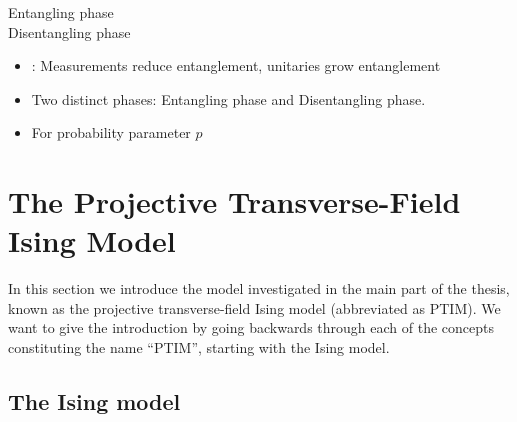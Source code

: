 \begin{description}
  \item[Entangling phase] 
  \item[Disentangling phase]
\end{description}

\begin{itemize}
  \item {}: Measurements reduce entanglement, unitaries
    grow entanglement
  \item Two distinct phases: Entangling phase and Disentangling phase.
  \item For probability parameter $p$ 
\end{itemize}

\clearpage
\section{The Projective Transverse-Field Ising Model}\label{sec:intro-ptim}
In this section we introduce the model investigated in the main part of the
thesis, known as the projective transverse-field Ising model (abbreviated as
PTIM). We want to give the introduction by going backwards through each of the
concepts constituting the name \enquote{PTIM}, starting with the Ising model.

\subsection{The Ising model}


